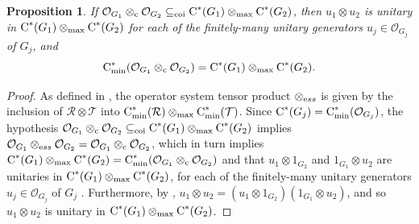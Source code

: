 \documentclass{amsart}
\newtheorem{proposition}[theorem]{Proposition}
\theoremstyle{definition}
\theoremstyle{remark}
\newcommand\osr{{\mathcal R}}
\newcommand\ost{{\mathcal T}}
\newcommand\omax{\otimes_{\textrm{max}}}
\newcommand\cstar{{\textrm C}^*}                              %
\newcommand\cstare{{\textrm C}_{\textrm{min}}^*}              %
\numberwithin{equation}{section}
\begin{document}
\begin{proposition}\label{(c-max)_unitaries}
	If $\mathcal O_{G_1}\otimes_{\textrm c}\mathcal O_{G_2}\subseteq_{\textrm{coi}}\cstar(G_1)\otimes_{\textrm{max}}\cstar(G_2)$, 
	then $u_1\otimes u_2$ is unitary in $\cstar(G_1)\otimes_{\textrm{max}}\cstar(G_2)$ for each of the finitely-many
	unitary generators $u_j\in\mathcal O_{G_j}$ of $G_j$, and
\[
\cstar_{\textrm{min}}(\mathcal O_{G_1}\otimes_{\textrm c}\mathcal O_{G_2})=\cstar(G_1)\otimes_{\textrm{max}}\cstar(G_2).
\]
\end{proposition}
\begin{proof} As defined in \cite{farenick--kavruk--paulsen--todorov2014},
the operator system tensor product $\otimes_{\textrm ess}$ is given by the inclusion of $\osr\otimes\ost$ into $\cstare(\osr)\omax\cstare(\ost)$.
Since $\cstar(G_j)=\cstare(\mathcal O_{G_j})$, the hypothesis $\mathcal O_{G_1}\otimes_{\textrm c}\mathcal O_{G_2}\subseteq_{\textrm{coi}}\cstar(G_1)\otimes_{\textrm{max}}\cstar(G_2)$ 
implies $\mathcal O_{G_1}\otimes_{\textrm ess}\mathcal O_{G_2}=\mathcal O_{G_1}\otimes_{\textrm c}\mathcal O_{G_2}$, which in turn implies 
$\cstar(G_1)\otimes_{\textrm{max}}\cstar(G_2)=\cstare(\mathcal O_{G_1}\otimes_{\textrm c}\mathcal O_{G_2})$ and
that
$u_1\otimes 1_{G_2}$ and $1_{G_1}\otimes u_2$ are unitaries in $\cstar(G_1)\otimes_{\textrm{max}}\cstar(G_2)$,
for each of the finitely-many
unitary generators $u_j\in\mathcal O_{G_j}$ of $G_j$
\cite[Theorem 3.5]{farenick--kavruk--paulsen--todorov2014}.
Furthermore, by \cite[Lemma 3.4]{farenick--kavruk--paulsen--todorov2014}, $u_1\otimes u_2=(u_1\otimes 1_{G_2})(1_{G_1}\otimes u_2)$, 
and so $u_1\otimes u_2$ is unitary in $\cstar(G_1)\otimes_{\textrm{max}}\cstar(G_2)$. 
\end{proof}
\end{document}
